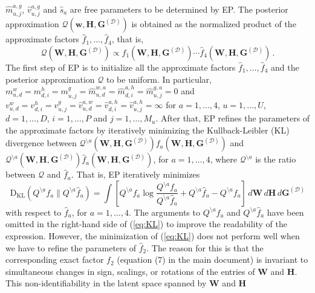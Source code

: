 \documentclass{article}
\begin{document}
$\hat{m}_{u,j}^{a,g}$, $\hat{v}_{u,j}^{a,g}$ and $\hat{s}_a$ are free parameters to be determined by EP. 
The posterior approximation $\mathcal{Q}(\mathbf{w},\mathbf{H},\mathbf{G}^{(\mathcal{D})})$
is obtained as the normalized product of the approximate factors $\hat{f}_{1},\ldots,\hat{f}_{4}$, that is,
\begin{equation}
\mathcal{Q}(\mathbf{W},\mathbf{H},\mathbf{G}^{(\mathcal{D})}) \propto
\hat{f}_{1}(\mathbf{W},\mathbf{H},\mathbf{G}^{(\mathcal{D})})\cdots\hat{f}_{4}(\mathbf{W},\mathbf{H},\mathbf{G}^{(\mathcal{D})})\,.
\end{equation}
The first step of EP is to initialize all the approximate factors $\hat{f}_1,\ldots,\hat{f}_4$ and the posterior approximation $\mathcal{Q}$ to be uniform.
In particular,
$m_{u,d}^w=m_{d,i}^h=m_{u,j}^g=\hat{m}_{u,d}^{w,a}=\hat{m}_{d,i}^{a,h}=\hat{m}_{u,j}^{g,a}=0$ and 
$v_{u,d}^w = v_{d,i}^h = v_{u,j}^g = \hat{v}_{u,d}^{a,w} = \hat{v}_{d,i}^{a,h} = \hat{v}_{u,j}^{a,h} = \infty$ for
$a=1,\ldots,4$, $u=1,\ldots,U$, $d=1,\ldots,D$, $i=1,\ldots,P$ and $j = 1,\ldots,M_u$.
After that, EP refines the parameters of the approximate factors by iteratively minimizing the Kullback-Leibler (KL) divergence
between $\mathcal{Q}^{\setminus a}(\mathbf{W},\mathbf{H},\mathbf{G}^{(\mathcal{D})})f_a(\mathbf{W},\mathbf{H},\mathbf{G}^{(\mathcal{D})})$
and $\mathcal{Q}^{\setminus a}(\mathbf{W},\mathbf{H},\mathbf{G}^{(\mathcal{D})})\hat{f}_a(\mathbf{W},\mathbf{H},\mathbf{G}^{(\mathcal{D})})$, for $a=1,\ldots,4$,
where $\mathcal{Q}^{\setminus a}$ is the ratio between $\mathcal{Q}$ and $\hat{f}_a$. That is, EP iteratively minimizes
\begin{equation} 
\text{D}_{\text{KL}}(Q^{\setminus a}f_a\|Q^{\setminus a}\hat{f}_a) 
= \int \left[Q^{\setminus a}f_a \log \frac{Q^{\setminus a}f_a}{Q^{\setminus a}\hat{f}_a}+
Q^{\setminus a}\hat{f}_a-Q^{\setminus a}f_a\right]\,d\mathbf{W}\,d\mathbf{H}\,d\mathbf{G}^{(\mathcal{D})}\label{eq:KL}
\end{equation}
with respect to $\hat{f}_a$, for $a = 1,\ldots,4$.
The arguments to $Q^{\setminus a}f_a $ and 
$Q^{\setminus a}\hat{f}_a$ have been omitted in the 
right-hand side of (\ref{eq:KL}) to improve the readability of the expression.
However, the minimization of (\ref{eq:KL}) does not perform well when we have to refine the parameters of $\hat{f}_2$.
The reason for this is that the corresponding exact factor $f_2$ (equation (7) in the main document)
is invariant to simultaneous changes in sign, scalings, or rotations of the entries of $\mathbf{W}$ and $\mathbf{H}$.
This non-identifiability in the latent space spanned by $\mathbf{W}$ and $\mathbf{H}$
\end{document}
